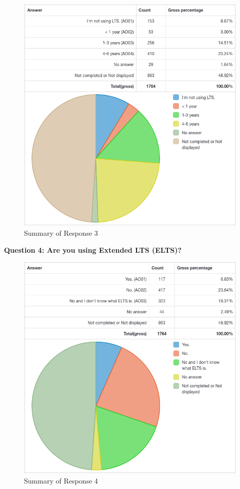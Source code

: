 \documentclass{article}
\begin{document}
\vspace{3mm}
\begin{figure}[h!]
\centering
\includegraphics[width=16.5cm]{assets/3-summary.png}
\caption{Summary of Response 3}
\end{figure}

\newpage

\Large{\textbf{Question 4: Are you using Extended LTS (ELTS)?}}

\vspace{3mm}
\begin{figure}[h!]
\centering
\includegraphics[width=16.5cm]{assets/4-summary.png}
\caption{Summary of Response 4}
\end{figure}
\end{document}
